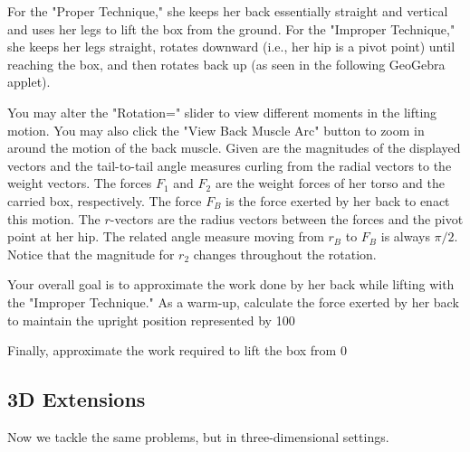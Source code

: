 \documentclass{ximera}
\begin{document}
For the "Proper Technique," she keeps her back essentially straight and vertical and uses her legs to lift the box from the ground. For the "Improper Technique," she keeps her legs straight, rotates downward (i.e., her hip is a pivot point) until reaching the box, and then rotates back up (as seen in the following GeoGebra applet).

You may alter the "Rotation=" slider to view different moments in the lifting motion. You may also click the "View Back Muscle Arc" button to zoom in around the motion of the back muscle. Given are the magnitudes of the displayed vectors and the tail-to-tail angle measures curling from the radial vectors to the weight vectors. The forces $F_1$ and $F_2$ are the weight forces of her torso and the carried box, respectively. The force $F_B$ is the force exerted by her back to enact this motion. The $r$-vectors are the radius vectors between the forces and the pivot point at her hip. The related angle measure moving from $r_B$ to $F_B$ is always $\pi/2$. Notice that the magnitude for $r_2$ changes throughout the rotation.

\begin{center}
\end{center}

Your overall goal is to approximate the work done by her back while lifting with the "Improper Technique." As a warm-up, calculate the force exerted by her back to maintain the upright position represented by 100%

Finally, approximate the work required to lift the box from 0%

\subsection*{3D Extensions}

Now we tackle the same problems, but in three-dimensional settings.
\end{document}
